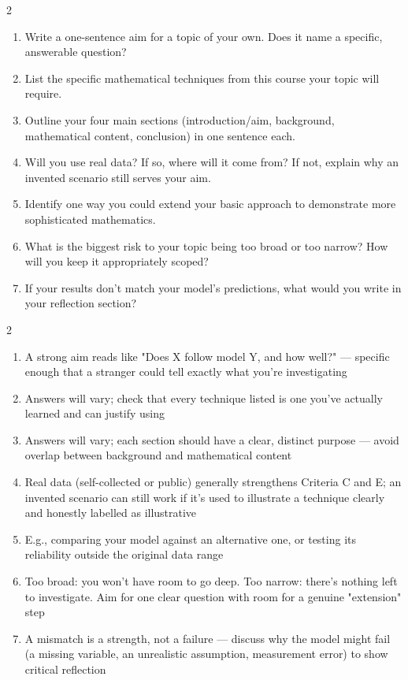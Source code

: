 \documentclass[11pt]{article}
\begin{document}
\clearpage
{}

\begin{recapbox}
\begin{multicols}{2}
\small
\begin{enumerate}[leftmargin=*,itemsep=3pt]
  \item Write a one-sentence aim for a topic of your own. Does it name a specific, answerable question?
  \item List the specific mathematical techniques from this course your topic will require.
  \item Outline your four main sections (introduction/aim, background, mathematical content, conclusion) in one sentence each.
  \item Will you use real data? If so, where will it come from? If not, explain why an invented scenario still serves your aim.
  \item Identify one way you could extend your basic approach to demonstrate more sophisticated mathematics.
  \item What is the biggest risk to your topic being too broad or too narrow? How will you keep it appropriately scoped?
  \item If your results don't match your model's predictions, what would you write in your reflection section?
\end{enumerate}
\end{multicols}
\end{recapbox}

\begin{keybox}
\begin{multicols}{2}
\small
\begin{enumerate}[leftmargin=*,itemsep=3pt]
  \item A strong aim reads like "Does X follow model Y, and how well?" --- specific enough that a stranger could tell exactly what you're investigating
  \item Answers will vary; check that every technique listed is one you've actually learned and can justify using
  \item Answers will vary; each section should have a clear, distinct purpose --- avoid overlap between background and mathematical content
  \item Real data (self-collected or public) generally strengthens Criteria C and E; an invented scenario can still work if it's used to illustrate a technique clearly and honestly labelled as illustrative
  \item E.g., comparing your model against an alternative one, or testing its reliability outside the original data range
  \item Too broad: you won't have room to go deep. Too narrow: there's nothing left to investigate. Aim for one clear question with room for a genuine "extension" step
  \item A mismatch is a strength, not a failure --- discuss why the model might fail (a missing variable, an unrealistic assumption, measurement error) to show critical reflection
\end{enumerate}
\end{multicols}
\end{keybox}
\end{document}
